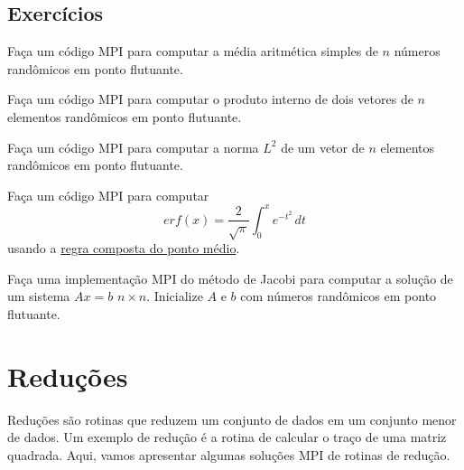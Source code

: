\subsection*{Exercícios}

\begin{exer}
  Faça um código MPI para computar a média aritmética simples de $n$ números randômicos em ponto flutuante.
\end{exer}

\begin{exer}
  Faça um código MPI para computar o produto interno de dois vetores de $n$ elementos randômicos em ponto flutuante.
\end{exer}

\begin{exer}
  Faça um código MPI para computar a norma $L^2$ de um vetor de $n$ elementos randômicos em ponto flutuante.
\end{exer}

\begin{exer}
  Faça um código MPI para computar
  \begin{equation}
    erf(x) = \frac{2}{\sqrt{\pi}}\int_0^x e^{-t^2}\,dt
  \end{equation}
  usando a \href{https://phkonzen.github.io/notas/MatematicaNumerica/cap_integr_sec_int_comp.html}{regra composta do ponto médio}.
\end{exer}

\begin{exer}
  Faça uma implementação MPI do método de Jacobi para computar a solução de um sistema $Ax=b$ $n\times n$. Inicialize $A$ e $b$ com números randômicos em ponto flutuante.
\end{exer}


\section {Reduções} \label {cap_mpi_sec_redu}

Reduções são rotinas que reduzem um conjunto de dados em um conjunto menor de dados. Um exemplo de redução é a rotina de calcular o traço de uma matriz quadrada. Aqui, vamos apresentar algumas soluções MPI de rotinas de redução.

